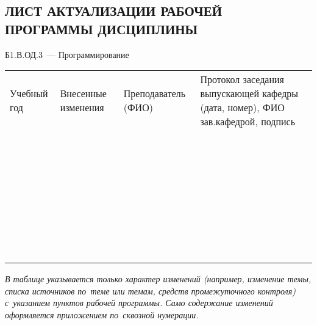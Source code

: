 \documentclass[a4paper,12pt]{article}
\begin{document}
\newpage
\begin{center}
\section*{ЛИСТ АКТУАЛИЗАЦИИ РАБОЧЕЙ ПРОГРАММЫ ДИСЦИПЛИНЫ}
Б1.В.ОД.3\ --- Программирование 
\end{center}

  \noindent
  \begin{tabular}{|p{15mm}|p{67mm}|p{25mm}|p{41mm}|}
    \hline
    \small\centering
    Учебный год 
    & \small\centering
    Внесенные изменения 
    & \small\centering
    Преподаватель (ФИО) 
    & \small\centering\arraybackslash
    Протокол заседания выпускающей кафедры (дата, номер), ФИО зав.кафедрой, подпись \\
    & & & \\\hline
    & & & \\\hline
    & & & \\\hline
    & & & \\\hline
    & & & \\\hline
    & & & \\\hline
    & & & \\\hline
    & & & \\\hline
    & & & \\\hline
    & & & \\\hline
    & & & \\\hline
    & & & \\\hline
    & & & \\\hline
    & & & \\\hline
    & & & \\\hline
    & & & \\\hline
    & & & \\\hline
    & & & \\\hline
    & & & \\\hline
    & & & \\\hline
    & & & \\\hline
    & & & \\\hline
    & & & \\\hline
    & & & \\\hline
    & & & \\\hline
    & & & \\\hline
    & & & \\\hline
    & & & \\\hline
    & & & \\\hline
    & & & \\\hline
    & & & \\\hline
    & & & \\\hline
    & & & \\\hline
    & & & \\\hline
    & & & \\\hline
    & & & \\\hline
  \end{tabular}

  \medskip\noindent\textit{В таблице указывается только характер изменений (например, изменение темы, списка источников по~теме или темам, средств промежуточного контроля) с~указанием пунктов рабочей программы. Само содержание изменений оформляется приложением по~сквозной нумерации.}

\newpage\tableofcontents
\end{document}
